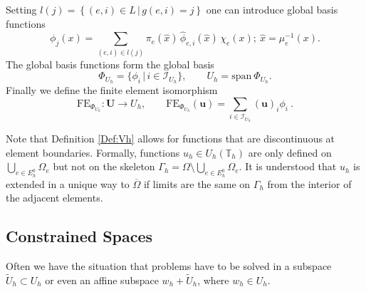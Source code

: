 Setting $l(j) = \left\{ (e,i)\in L \,|\, g(e,i)=j \right\}$ one can
introduce global basis functions
\begin{equation*}
\phi_j(x) = \sum_{(e,i)\in l(j)} \pi_e(\hat{x}) \,
\hat\phi_{e,i}(\hat{x}) \, \chi_e(x); \ \hat{x}=\mu_e^{-1}(x).
\end{equation*} 
The global basis functions form the global basis
\begin{equation}
\Phi_{U_h} = \{\phi_i \,|\, i\in \mathcal{I}_{U_h}\}, \qquad U_h = \text{span}\ \Phi_{U_h}.
\end{equation}
Finally we define the finite element isomorphism
\begin{equation}\label{Eq:FiniteElementIsomorphism}
\text{FE}_{\Phi_{U_h}} : \mathbf{U} \to U_h, \qquad \text{FE}_{\Phi_{U_h}}(\mathbf{u}) = \sum_{i\in\mathcal{I}_{U_h}} (\mathbf{u})_i \phi_i \ .
\end{equation} 

Note that Definition \ref{Def:Vh} allows for functions that are
discontinuous at element boundaries. Formally, functions $u_h\in
U_h(\mathbb{T}_h)$ are only defined on $\bigcup_ {e\in E_h^0} \Omega_e$
but not on the skeleton $\Gamma_h = \Omega\setminus \bigcup_ {e\in
  E_h^0} \Omega_e$. It is understood that $u_h$ is extended in a
unique way to $\overline{\Omega}$ if limits are the same on $\Gamma_h$ from
the interior of the adjacent elements.

\subsection{Constrained Spaces}

Often we have the situation that problems have to be solved in a
subspace $\tilde{U}_h\subset U_h$ or even an affine subspace
$w_h+\tilde{U}_h$, where $w_h\in U_h$.

